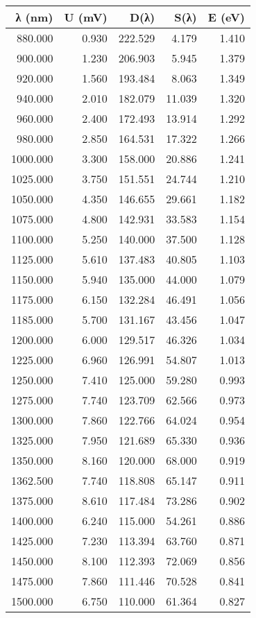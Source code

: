 \begin{tabular}{rrrrr}
\toprule
λ (nm) & U (mV) & D(λ) & S(λ) & E (eV) \\
\midrule
880.000 & 0.930 & 222.529 & 4.179 & 1.410 \\
900.000 & 1.230 & 206.903 & 5.945 & 1.379 \\
920.000 & 1.560 & 193.484 & 8.063 & 1.349 \\
940.000 & 2.010 & 182.079 & 11.039 & 1.320 \\
960.000 & 2.400 & 172.493 & 13.914 & 1.292 \\
980.000 & 2.850 & 164.531 & 17.322 & 1.266 \\
1000.000 & 3.300 & 158.000 & 20.886 & 1.241 \\
1025.000 & 3.750 & 151.551 & 24.744 & 1.210 \\
1050.000 & 4.350 & 146.655 & 29.661 & 1.182 \\
1075.000 & 4.800 & 142.931 & 33.583 & 1.154 \\
1100.000 & 5.250 & 140.000 & 37.500 & 1.128 \\
1125.000 & 5.610 & 137.483 & 40.805 & 1.103 \\
1150.000 & 5.940 & 135.000 & 44.000 & 1.079 \\
1175.000 & 6.150 & 132.284 & 46.491 & 1.056 \\
1185.000 & 5.700 & 131.167 & 43.456 & 1.047 \\
1200.000 & 6.000 & 129.517 & 46.326 & 1.034 \\
1225.000 & 6.960 & 126.991 & 54.807 & 1.013 \\
1250.000 & 7.410 & 125.000 & 59.280 & 0.993 \\
1275.000 & 7.740 & 123.709 & 62.566 & 0.973 \\
1300.000 & 7.860 & 122.766 & 64.024 & 0.954 \\
1325.000 & 7.950 & 121.689 & 65.330 & 0.936 \\
1350.000 & 8.160 & 120.000 & 68.000 & 0.919 \\
1362.500 & 7.740 & 118.808 & 65.147 & 0.911 \\
1375.000 & 8.610 & 117.484 & 73.286 & 0.902 \\
1400.000 & 6.240 & 115.000 & 54.261 & 0.886 \\
1425.000 & 7.230 & 113.394 & 63.760 & 0.871 \\
1450.000 & 8.100 & 112.393 & 72.069 & 0.856 \\
1475.000 & 7.860 & 111.446 & 70.528 & 0.841 \\
1500.000 & 6.750 & 110.000 & 61.364 & 0.827 \\

\end{tabular}
